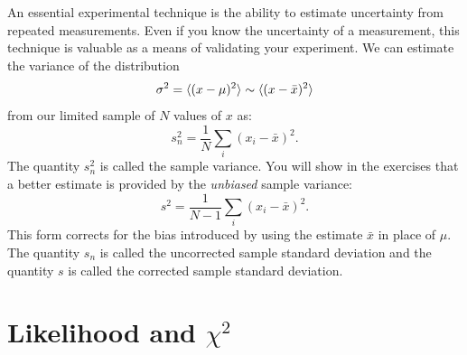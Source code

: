 \documentclass[12pt,oneside]{book}
\begin{document}
An essential experimental technique is the ability to estimate
uncertainty from repeated measurements.  Even if you know the
uncertainty of a measurement, this technique is valuable as a means of
validating your experiment.  We can estimate the variance of the distribution
\begin{displaymath}
 \sigma^2 = \braket{(x-\mu)^2} \sim \braket{(x - \bar{x})^2}
\end{displaymath}
from our limited sample of $N$ values of $x$ as:
\begin{displaymath}
s_n^2  = \frac{1}{N} \sum_i (x_i-\bar{x})^2.
\end{displaymath}
The quantity $s_n^2$ is called the sample variance.  You will show in
the exercises that a better estimate is provided by the {\em unbiased}
sample variance:
\begin{displaymath}
\label{eqn:sampvar}
s^2  = \frac{1}{N-1} \sum_i (x_i-\bar{x})^2.
\end{displaymath}
This form corrects for the bias introduced by using the estimate $\bar{x}$ in place of $\mu$.  The quantity $s_n$ is called the uncorrected sample standard deviation
and the quantity $s$ is called the corrected sample standard
deviation.


\section{Likelihood and $\chi^2$ }
\end{document}
